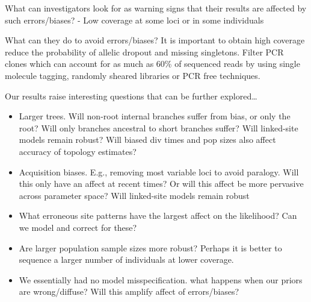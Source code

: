 What can investigators look for as warning signs that their results
are affected by such errors/biases?
- Low coverage at some loci or in some individuals

What can they do to avoid errors/biases?
It is important to obtain high coverage reduce the probability of allelic dropout
and missing singletons. 
Filter PCR clones which can account for as much as 60\% of sequenced reads 
\citep{andrewsHarnessingPowerRADseq2016; smithBiasedEstimatesClonal2014} by using single molecule tagging, randomly sheared libraries or PCR free
techniques.

Our results raise interesting questions that can be further explored\ldots
\begin{itemize}
    \item Larger trees. Will non-root internal branches suffer from bias, or
        only the root? Will only branches ancestral to short branches suffer?
        Will linked-site models remain robust?
        Will biased div times and pop sizes also affect accuracy of topology
        estimates?
    \item Acquisition biases. E.g., removing most variable loci to avoid
        paralogy. Will this only have an affect at recent times? Or will
        this affect be more pervasive across parameter space?
        Will linked-site models remain robust
    \item What erroneous site patterns have the largest affect on
        the likelihood? Can we model and correct for these?
    \item Are larger population sample sizes more robust? Perhaps it is better
        to sequence a larger number of individuals at lower coverage.
    \item We essentially had no model misspecification.
        what happens when our priors are wrong/diffuse?
        Will this amplify affect of errors/biases?
\end{itemize}

